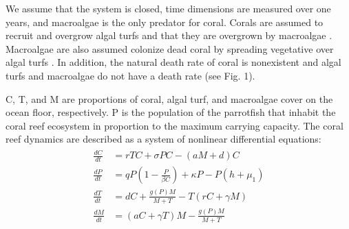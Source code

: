 \documentclass[12pt]{article}
\begin{document}
We assume that the system is closed, time dimensions are measured over one years, and macroalgae is the only predator for coral. Corals are assumed to recruit and overgrow algal turfs and that they are overgrown by macroalgae \cite{04_mathanalysis}. Macroalgae are also assumed colonize dead coral by spreading vegetative over algal turfs \cite{04_mathanalysis}. In addition, the natural death rate of coral is nonexistent and algal turfs and macroalgae do not have a death rate (see Fig. 1).


C, T, and M are proportions of coral, algal turf, and macroalgae cover on the ocean floor, respectively. P is the population of the parrotfish that inhabit the coral reef ecosystem in proportion to the maximum carrying capacity. The coral reef dynamics are described as a system of nonlinear differential equations: 
\begin{align}
    \begin{split}
        \frac{dC}{dt} &= rTC + \sigma P C- (aM+d)C\\
        \frac{dP}{dt} &= qP \left( 1-\frac{P}{\beta C} \right) + \kappa P - P \left( h+\mu_{1} \right)\\
        \frac{dT}{dt} &= dC + \frac{g(P)M}{M+T} - T(rC+\gamma M)\\
        \frac{dM}{dt} &= (aC+ \gamma T)M - \frac{g(P)M}{M+T}
    \end{split}
\end{align}
\end{document}
